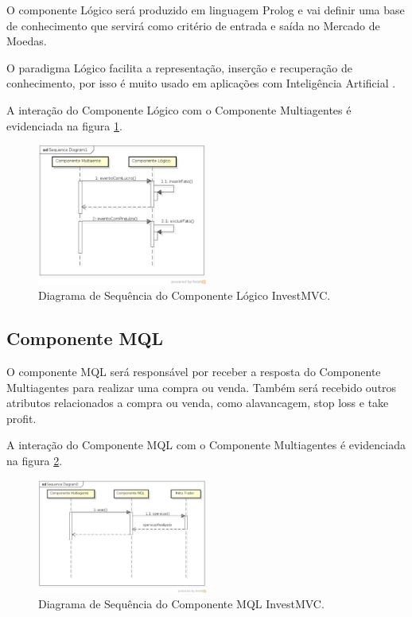 O componente Lógico será produzido em linguagem Prolog e vai definir uma base de conhecimento que servirá como critério de entrada e saída no Mercado de Moedas.

O paradigma Lógico facilita a representação, inserção e recuperação de conhecimento, por isso é muito usado em aplicações com Inteligência Artificial \cite{almeida2010}.

A interação do Componente Lógico com o Componente Multiagentes é evidenciada na figura \ref{sequenciaLogico}.

\begin{figure}[H]
\centering
\includegraphics[width=0.5\textwidth]{figuras/sequenciaLogico}
\caption{Diagrama de Sequência do Componente Lógico InvestMVC.}
\label{sequenciaLogico}
\end{figure}

\subsection{Componente MQL}

O componente MQL será responsável por receber a resposta do Componente Multiagentes para realizar uma compra ou venda. Também será recebido outros atributos relacionados a compra ou venda, como alavancagem, stop loss e take profit.

A interação do Componente MQL com o Componente Multiagentes é evidenciada na figura \ref{sequenciaMQL}.

\begin{figure}[H]
\centering
\includegraphics[width=0.5\textwidth]{figuras/sequenciaMQL}
\caption{Diagrama de Sequência do Componente MQL InvestMVC.}
\label{sequenciaMQL}
\end{figure}

